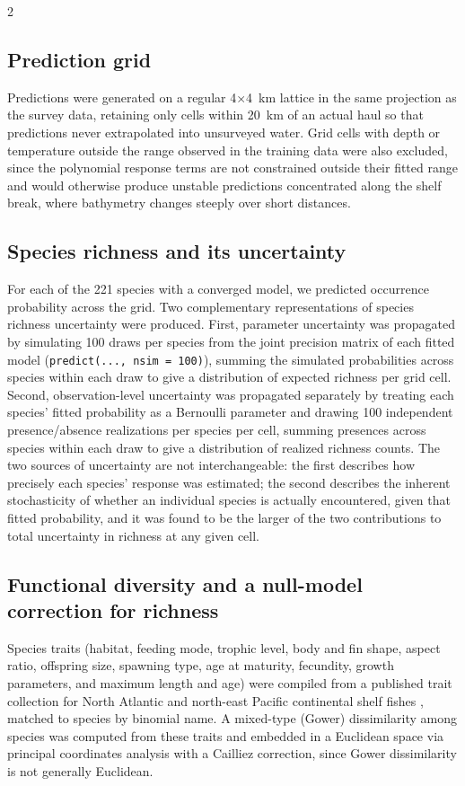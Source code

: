 \begin{spacing}{2}
\subsection{Prediction grid}
Predictions were generated on a regular 4$\times$4~km lattice in the same projection as the survey data, retaining only cells within 20~km of an actual haul so that predictions never extrapolated into unsurveyed water. Grid cells with depth or temperature outside the range observed in the training data were also excluded, since the polynomial response terms are not constrained outside their fitted range and would otherwise produce unstable predictions concentrated along the shelf break, where bathymetry changes steeply over short distances.

\subsection{Species richness and its uncertainty}
For each of the 221 species with a converged model, we predicted occurrence probability across the grid. Two complementary representations of species richness uncertainty were produced. First, parameter uncertainty was propagated by simulating 100 draws per species from the joint precision matrix of each fitted model (\texttt{predict(..., nsim = 100)}), summing the simulated probabilities across species within each draw to give a distribution of expected richness per grid cell. Second, observation-level uncertainty was propagated separately by treating each species' fitted probability as a Bernoulli parameter and drawing 100 independent presence/absence realizations per species per cell, summing presences across species within each draw to give a distribution of realized richness counts. The two sources of uncertainty are not interchangeable: the first describes how precisely each species' response was estimated; the second describes the inherent stochasticity of whether an individual species is actually encountered, given that fitted probability, and it was found to be the larger of the two contributions to total uncertainty in richness at any given cell.

\subsection{Functional diversity and a null-model correction for richness}
Species traits (habitat, feeding mode, trophic level, body and fin shape, aspect ratio, offspring size, spawning type, age at maturity, fecundity, growth parameters, and maximum length and age) were compiled from a published trait collection for North Atlantic and north-east Pacific continental shelf fishes \citep{beukhofTraitCollection2019}, matched to species by binomial name. A mixed-type (Gower) dissimilarity among species was computed from these traits and embedded in a Euclidean space via principal coordinates analysis with a Cailliez correction, since Gower dissimilarity is not generally Euclidean.


\end{spacing}
